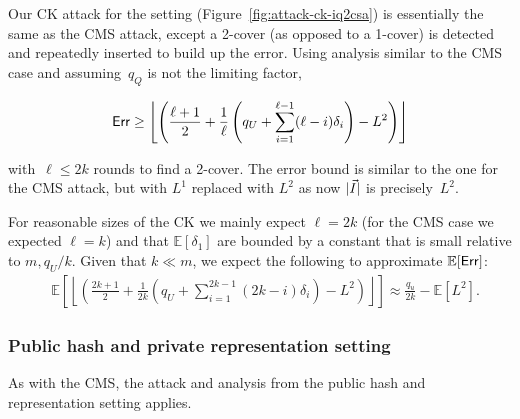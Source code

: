 Our CK attack for the setting (Figure~\ref{fig:attack-ck-iq2csa}) is essentially the same as the CMS attack, except a 2-cover (as opposed to a 1-cover) is detected and repeatedly inserted to build up the error. Using analysis similar to the CMS case and assuming~$q_Q$ is not the limiting factor,

$$\mathsf{Err} \geq 
	\left \lfloor \left( \frac{\ell+1}{2} + \frac{1}{\ell}\left(q_U + \sum_{i=1}^{\ell-1}(\ell-i)\delta_i \right) - L^2 \right) \right\rfloor$$

with~$\ell \leq 2k$ rounds to find a 2-cover. The error bound is similar to the one for the CMS attack, but with $L^1$ replaced with $L^2$ as now $|\vec{I}|$ is precisely~$L^2$.  

For reasonable sizes of the CK we mainly expect $\ell = 2k$ (for the CMS case we expected $\ell{=}k$) and that $\mathbb{E}\left[\delta_1\right]$ are bounded by a constant that is small relative to $m, q_U/k$. Given that $k \ll m$, we expect the following to approximate $\mathbb{E}[\mathsf{Err}]$:
\begin{align*}
	&\mathbb{E}\left[\left\lfloor \left( \frac{2k+1}{2} + \frac{1}{2k}\left(q_U + \sum_{i=1}^{2k-1}(2k-i)\delta_i \right) - L^2 \right) \right\rfloor\right]\approx \frac{q_u}{2k} -  \mathbb{E}[L^2].
\end{align*}

\subsubsection{Public hash and private representation setting}
As with the CMS, the attack and analysis from the public hash and representation setting applies.

